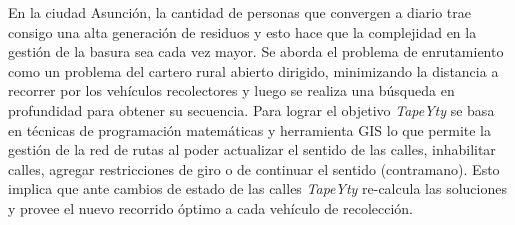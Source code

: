 \begin{resumen}
En la ciudad Asunción, la cantidad de personas que convergen a diario trae consigo una alta generación de residuos y esto hace que la complejidad en la gestión de la basura sea cada vez mayor. Se aborda el problema de enrutamiento como un problema del cartero rural abierto dirigido, minimizando la distancia a recorrer por los vehículos recolectores y luego se realiza una búsqueda en profundidad para obtener su secuencia. Para lograr el objetivo \textit{TapeYty} se basa en técnicas de programación matemáticas y herramienta GIS lo que permite la gestión de la red de rutas al poder actualizar el sentido de las calles, inhabilitar calles, agregar restricciones de giro o de continuar el sentido (contramano). Esto implica que ante cambios de estado de las calles \textit{TapeYty} re-calcula las soluciones y provee el nuevo recorrido óptimo a cada vehículo de recolección.
\end{resumen}